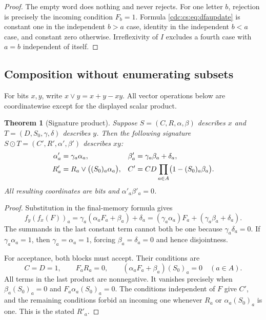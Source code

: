 \documentclass[11pt,a4paper]{article}
\newtheorem{theorem}{Theorem}[section]
\theoremstyle{definition}
\theoremstyle{remark}
\begin{document}
\begin{proof}
The empty word does nothing and never rejects. For one letter $b$, rejection
is precisely the incoming condition $F_b=1$. Formula
\eqref{cdc:cs:eq:dfaupdate} is constant one in the independent $b>a$ case, identity
in the independent $b<a$ case, and constant zero otherwise. Irreflexivity of
$I$ excludes a fourth case with $a=b$ independent of itself.
\end{proof}

\subsection{Composition without enumerating subsets}

For bits $x,y$, write $x\lor y=x+y-xy$. All vector operations below are
coordinatewise except for the displayed scalar product.

\begin{theorem}[Signature product]
\label{cdc:cs:thm:sigproduct}
Suppose $S=(C,R,\alpha,\beta)$ describes $x$ and
$T=(D,S_0,\gamma,\delta)$ describes $y$. Then the following signature
$S\odot T=(C',R',\alpha',\beta')$ describes $xy$:
\begin{align}
\label{cdc:cs:eq:sigproduct}
\alpha'_a&=\gamma_a\alpha_a,&
\beta'_a&=\gamma_a\beta_a+\delta_a,\\
R'_a&=R_a\lor\bigl((S_0)_a\alpha_a\bigr),&
C'&=CD\prod_{a\in A}\bigl(1-(S_0)_a\beta_a\bigr).
\notag
\end{align}
All resulting coordinates are bits and $\alpha'_a\beta'_a=0$.
\end{theorem}

\begin{proof}
Substitution in the final-memory formula gives
\[
f_y(f_x(F))_a
=\gamma_a(\alpha_aF_a+\beta_a)+\delta_a
=(\gamma_a\alpha_a)F_a+(\gamma_a\beta_a+\delta_a).
\]
The summands in the last constant term cannot both be one because
$\gamma_a\delta_a=0$. If $\gamma_a\alpha_a=1$, then
$\gamma_a=\alpha_a=1$, forcing $\beta_a=\delta_a=0$ and hence disjointness.

For acceptance, both blocks must accept. Their conditions are
\[
C=D=1,\qquad F_aR_a=0,\qquad
(\alpha_aF_a+\beta_a)(S_0)_a=0\quad(a\in A).
\]
All terms in the last product are nonnegative. It vanishes precisely when
$\beta_a(S_0)_a=0$ and $F_a\alpha_a(S_0)_a=0$. The conditions independent of
$F$ give $C'$, and the remaining conditions forbid an incoming one whenever
$R_a$ or $\alpha_a(S_0)_a$ is one. This is the stated $R'_a$.
\end{proof}
\end{document}
